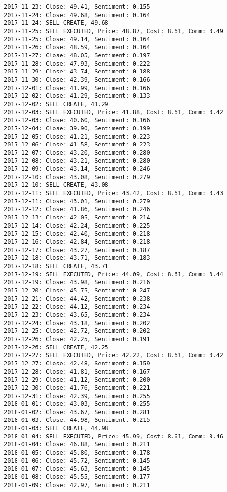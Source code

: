\documentclass[11pt]{article}
\begin{document}
\begin{Verbatim}[commandchars=\\\{\}]
2017-11-23: Close: 49.41, Sentiment: 0.155
2017-11-24: Close: 49.68, Sentiment: 0.164
2017-11-24: SELL CREATE, 49.68
2017-11-25: SELL EXECUTED, Price: 48.87, Cost: 8.61, Comm: 0.49
2017-11-25: Close: 49.14, Sentiment: 0.164
2017-11-26: Close: 48.59, Sentiment: 0.164
2017-11-27: Close: 48.05, Sentiment: 0.197
2017-11-28: Close: 47.93, Sentiment: 0.222
2017-11-29: Close: 43.74, Sentiment: 0.188
2017-11-30: Close: 42.39, Sentiment: 0.166
2017-12-01: Close: 41.99, Sentiment: 0.166
2017-12-02: Close: 41.29, Sentiment: 0.133
2017-12-02: SELL CREATE, 41.29
2017-12-03: SELL EXECUTED, Price: 41.88, Cost: 8.61, Comm: 0.42
2017-12-03: Close: 40.60, Sentiment: 0.166
2017-12-04: Close: 39.90, Sentiment: 0.199
2017-12-05: Close: 41.21, Sentiment: 0.223
2017-12-06: Close: 41.58, Sentiment: 0.223
2017-12-07: Close: 43.20, Sentiment: 0.280
2017-12-08: Close: 43.21, Sentiment: 0.280
2017-12-09: Close: 43.14, Sentiment: 0.246
2017-12-10: Close: 43.08, Sentiment: 0.279
2017-12-10: SELL CREATE, 43.08
2017-12-11: SELL EXECUTED, Price: 43.42, Cost: 8.61, Comm: 0.43
2017-12-11: Close: 43.01, Sentiment: 0.279
2017-12-12: Close: 41.86, Sentiment: 0.246
2017-12-13: Close: 42.05, Sentiment: 0.214
2017-12-14: Close: 42.24, Sentiment: 0.225
2017-12-15: Close: 42.40, Sentiment: 0.218
2017-12-16: Close: 42.84, Sentiment: 0.218
2017-12-17: Close: 43.27, Sentiment: 0.187
2017-12-18: Close: 43.71, Sentiment: 0.183
2017-12-18: SELL CREATE, 43.71
2017-12-19: SELL EXECUTED, Price: 44.09, Cost: 8.61, Comm: 0.44
2017-12-19: Close: 43.98, Sentiment: 0.216
2017-12-20: Close: 45.75, Sentiment: 0.247
2017-12-21: Close: 44.42, Sentiment: 0.238
2017-12-22: Close: 44.12, Sentiment: 0.234
2017-12-23: Close: 43.65, Sentiment: 0.234
2017-12-24: Close: 43.18, Sentiment: 0.202
2017-12-25: Close: 42.72, Sentiment: 0.202
2017-12-26: Close: 42.25, Sentiment: 0.191
2017-12-26: SELL CREATE, 42.25
2017-12-27: SELL EXECUTED, Price: 42.22, Cost: 8.61, Comm: 0.42
2017-12-27: Close: 42.48, Sentiment: 0.159
2017-12-28: Close: 41.81, Sentiment: 0.167
2017-12-29: Close: 41.12, Sentiment: 0.200
2017-12-30: Close: 41.76, Sentiment: 0.221
2017-12-31: Close: 42.39, Sentiment: 0.255
2018-01-01: Close: 43.03, Sentiment: 0.255
2018-01-02: Close: 43.67, Sentiment: 0.281
2018-01-03: Close: 44.98, Sentiment: 0.215
2018-01-03: SELL CREATE, 44.98
2018-01-04: SELL EXECUTED, Price: 45.99, Cost: 8.61, Comm: 0.46
2018-01-04: Close: 46.88, Sentiment: 0.211
2018-01-05: Close: 45.80, Sentiment: 0.178
2018-01-06: Close: 45.72, Sentiment: 0.145
2018-01-07: Close: 45.63, Sentiment: 0.145
2018-01-08: Close: 45.55, Sentiment: 0.177
2018-01-09: Close: 42.97, Sentiment: 0.211

\end{Verbatim}
\end{document}
